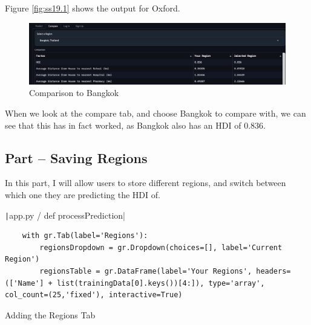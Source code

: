 \documentclass[12pt]{report}
\newcommand{\pil}[1]{\protect\texttt|#1|}
\begin{document}
Figure \ref{fig:ss19.1} shows the output for Oxford.

\begin{center}
\end{center}

\begin{figure}[H]
\centering
\includegraphics[width=14cm]{ss19.2.png}
\caption{Comparison to Bangkok}\label{fig:ss19.2}
\end{figure}

When we look at the compare tab, and choose Bangkok to compare with, we can see that this has in fact worked, as Bangkok also has an HDI of $0.836$.

\subsection{Part \theparts{} -- Saving Regions}

In this part, I will allow users to store different regions, and switch between which one they are predicting the HDI of.

\begin{listing}[H]
\pil{app.py / def processPrediction}
\begin{verbatim}
    with gr.Tab(label='Regions'):
        regionsDropdown = gr.Dropdown(choices=[], label='Current Region')
        regionsTable = gr.DataFrame(label='Your Regions', headers=(['Name'] + list(trainingData[0].keys())[4:]), type='array', col_count=(25,'fixed'), interactive=True)
\end{verbatim}
\caption{Adding the Regions Tab}\label{cs:regionsTab}
\end{listing}
\end{document}
